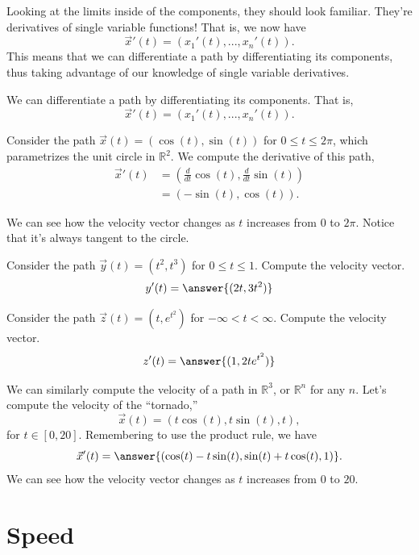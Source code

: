 \documentclass{ximera}
\begin{document}
Looking at the limits inside of the components, they should look familiar. They're derivatives of single variable functions! That is, we now have 
\[
\vec{x}'(t) = (x_1'(t),...,x_n'(t)).
\]
This means that we can differentiate a path by differentiating its components, thus taking advantage of our knowledge of single variable derivatives.

\begin{proposition}
We can differentiate a path by differentiating its components. That is,
\[
\vec{x}'(t) = (x_1'(t),...,x_n'(t)).
\]
\end{proposition}

\begin{example}
Consider the path $\vec{x}(t) = (\cos(t), \sin(t))$ for $0\leq t\leq 2\pi$, which parametrizes the unit circle in $\mathbb{R}^2$. We compute the derivative of this path,
\begin{align*}
\vec{x}'(t) &= \left(\frac{d}{dt}\cos(t), \frac{d}{dt}\sin(t)\right)\\
&= \left(-\sin(t), \cos(t)\right).
\end{align*}

We can see how the velocity vector changes as $t$ increases from $0$ to $2\pi$. Notice that it's always tangent to the circle.


\end{example}

\begin{problem}
Consider the path $\vec{y}(t) = (t^2,t^3)$ for $0\leq t\leq 1$. Compute the velocity vector.
\[
y'(t) = \answer{(2t, 3t^2)}
\]

Consider the path $\vec{z}(t) = \left(t, e^{t^2}\right)$ for $-\infty < t < \infty$. Compute the velocity vector.
\[
z'(t) = \answer{(1, 2te^{t^2})}
\]
\end{problem}

\begin{example}
We can similarly compute the velocity of a path in $\mathbb{R}^3$, or $\mathbb{R}^n$ for any $n$. Let's compute the velocity of the ``tornado,''
\[
\vec{x}(t) = (t\cos(t),t\sin(t),t),
\]
for $t\in [0,20]$. Remembering to use the product rule, we have
\[
\vec{x}'(t) = \answer{(\cos(t)-t\sin(t),\sin(t)+t\cos(t), 1)}.
\]
We can see how the velocity vector changes as $t$ increases from $0$ to $20$.

\end{example}

\section*{Speed}
\end{document}
